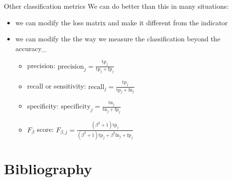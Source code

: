 \documentclass{beamer}
\begin{document}
\begin{frame}{Other classification metrics}
  We can do better than this in many situations:
  \begin{itemize}
    \item we can modify the loss matrix and make it different from the indicator
    \item we can modify the the way we measure the classification beyond the accuracy_
    \begin{itemize}
      \item precision: $\mathrm{precision}_j = \frac{\mathrm{tp}_j}{\mathrm{tp}_j+\mathrm{fp}_j}$
      \item recall or sensitivity: $\mathrm{recall}_j = \frac{\mathrm{tp}_j}{\mathrm{tp}_j+\mathrm{fn}_j}$
      \item specificity: $\mathrm{specificity}_j = \frac{\mathrm{tn}_j}{\mathrm{tn}_j+\mathrm{fp}_j}$
      \item $F_{\beta}$ score: $F_{\beta,j}=\frac{(\beta^2+1)\mathrm{tp}_j}{(\beta^2+1) \mathrm{tp}_j+\beta^2 \mathrm{fn}_j+\mathrm{fp}_j}$
    \end{itemize}
  \end{itemize}
\end{frame}

\section{Bibliography}


\end{document}

